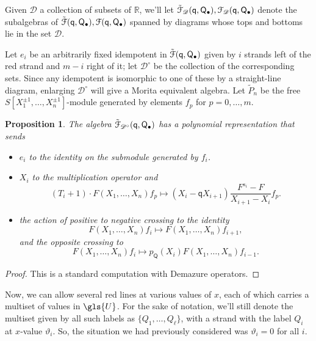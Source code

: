\documentclass[10pt]{article}
\newtheorem{prop}[theorem]{Proposition}
\theoremstyle{definition}
\newcommand{\pq}{\mathsf{q}}
\newcommand{\R}{\mathbb{R}}
\newcommand{\PQ}{\mathsf{Q}}
\begin{document}
Given ${\mathscr{D}}$ a collection of subsets of $\R$, we'll let $\tilde{\EuScript{F}}_{\mathscr{D}}
(\pq,\PQ_{\bullet}),{\EuScript{F}}_{\mathscr{D}} (\pq,\PQ_{\bullet})$
denote the subalgebras of $\tilde{\EuScript{F}}
(\pq,\PQ_{\bullet}),{\EuScript{F}} (\pq,\PQ_{\bullet})$ spanned by
diagrams whose tops and bottoms lie in the set ${\mathscr{D}}$.


 Let $e_i$ be an arbitrarily fixed idempotent in $\tilde{\EuScript{F}} (\pq,\PQ_{\bullet})$ given by
 $i$ strands left of the red strand and $m-i$ right of it; let
 $\mathscr{D}^\circ$ be the collection of the corresponding
 sets. Since any idempotent is isomorphic to one of these by a
 straight-line diagram, enlarging $\mathscr{D}^\circ$ will give a
 Morita equivalent algebra. Let
 $\tilde{P}_n$ be the free $S[X_1^{\pm 1},\dots, X_n^{\pm 1}]$-module generated
 by elements $f_p$ for $p=0,\dots, m$.
\begin{prop}\label{tilde-poly}
 The algebra $\tilde{\EuScript{F}}_{\mathscr{D}^\circ} (\pq,\PQ_{\bullet})$ has a polynomial
 representation that sends
 \begin{itemize}
\item $e_i$ to the identity on the submodule generated by $f_i$.
\item $X_i$ to the multiplication operator and \[(T_i+1)\cdot
 F(X_1,\dots,X_n)f_p\mapsto (X_i-\pq X_{i+1})\frac{F^{s_i}-F}{X_{i+1}-X_i}f_p.\]
 \item the action of positive to negative crossing to the identity
 \[F(X_1,\dots,X_n)f_i\mapsto
 F(X_1,\dots,X_n)f_{i+1},\] and the opposite crossing to
 \[F(X_1,\dots,X_n)f_i\mapsto
 p_\PQ(X_i)F(X_1,\dots,X_n)f_{i-1}.\]
 \end{itemize}
\end{prop}
\begin{proof}
 This is a standard computation with Demazure operators.
\end{proof}


Now, we can allow several red
lines at various values of $x$, each of which carries a multiset of
values in $\gls{U}$. For the sake of notation, we'll still denote the
multiset given by all such labels as $\{Q_1,\dots, Q_\ell\}$, with a strand with the label
$Q_{i}$ at $x$-value
$\vartheta_i$. So, the situation we had previously considered was
$\vartheta_i=0$ for all $i$.
\end{document}
